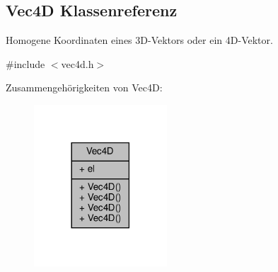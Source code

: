 \hypertarget{classVec4D}{}\subsection{Vec4D Klassenreferenz}
\label{classVec4D}


Homogene Koordinaten eines 3\+D-\/\+Vektors oder ein 4\+D-\/\+Vektor.  




{\ttfamily \#include $<$vec4d.\+h$>$}



Zusammengehörigkeiten von Vec4D\+:
\nopagebreak
\begin{figure}[H]
\begin{center}
\leavevmode
\includegraphics[width=141pt]{classVec4D__coll__graph}
\end{center}
\end{figure}
